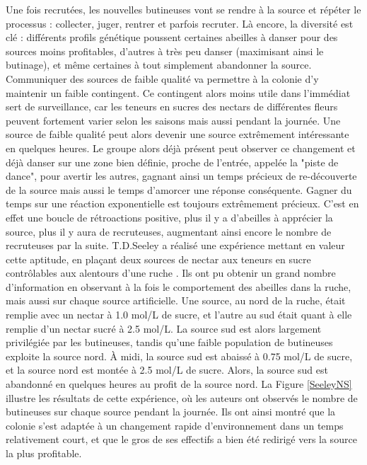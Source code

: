 			Une fois recrutées, les nouvelles butineuses vont se rendre à la source et répéter le processus : collecter, juger, rentrer et parfois recruter. Là encore, la diversité est clé : différents profils génétique poussent certaines abeilles à danser pour des sources moins profitables, d'autres à très peu danser (maximisant ainsi le butinage), et même certaines à tout simplement abandonner la source. Communiquer des sources de faible qualité va permettre à la colonie d'y maintenir un faible contingent. Ce contingent alors moins utile dans l'immédiat sert de surveillance, car les teneurs en sucres des nectars de différentes fleurs peuvent fortement varier selon les saisons mais aussi pendant la journée. Une source de faible qualité peut alors devenir une source extrêmement intéressante en quelques heures. Le groupe alors déjà présent peut observer ce changement et déjà danser sur une zone bien définie, proche de l'entrée, appelée la "piste de dance", pour avertir les autres, gagnant ainsi un temps précieux de re-découverte de la source mais aussi le temps d'amorcer une réponse conséquente. Gagner du temps sur une réaction exponentielle est toujours extrêmement précieux. C'est en effet une boucle de rétroactions positive, plus il y a d'abeilles à apprécier la source, plus il y aura de recruteuses, augmentant ainsi encore le nombre de recruteuses par la suite. T.D.Seeley a réalisé une expérience mettant en valeur cette aptitude, en plaçant deux sources de nectar aux teneurs en sucre contrôlables aux alentours d'une ruche \cite{seeley_collective_1991}. Ils ont pu obtenir un grand nombre d'information en observant à la fois le comportement des abeilles dans la ruche, mais aussi sur chaque source artificielle. Une source, au nord de la ruche, était remplie avec un nectar à 1.0 mol/L de sucre, et l'autre au sud était quant à elle remplie d'un nectar sucré à 2.5 mol/L. La source sud est alors largement privilégiée par les butineuses, tandis qu'une faible population de butineuses exploite la source nord. À midi, la source sud est abaissé à 0.75 mol/L de sucre, et la source nord est montée à 2.5 mol/L de sucre. Alors, la source sud est abandonné en quelques heures au profit de la source nord. La Figure \ref{SeeleyNS} illustre les résultats de cette expérience, où les auteurs ont observés le nombre de butineuses sur chaque source pendant la journée. Ils ont ainsi montré que la colonie s'est adaptée à un changement rapide d'environnement dans un temps relativement court, et que le gros de ses effectifs a bien été redirigé vers la source la plus profitable.
			
